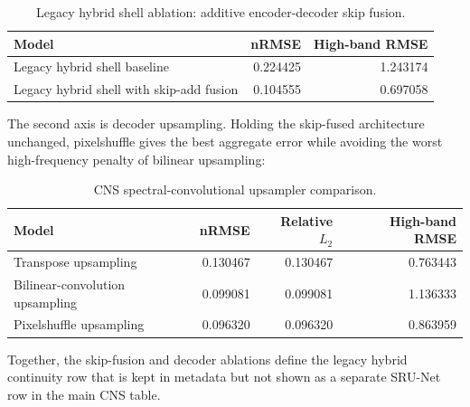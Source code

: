 \documentclass[11pt]{article}
\begin{document}
\begin{table}[h]
\centering
\caption{Legacy hybrid shell ablation: additive encoder-decoder skip fusion.}
\begin{tabular}{lrr}
\toprule
Model & nRMSE & High-band RMSE \\
\midrule
Legacy hybrid shell baseline & 0.224425 & 1.243174 \\
Legacy hybrid shell with skip-add fusion & 0.104555 & 0.697058 \\
\bottomrule
\end{tabular}
\end{table}

The second axis is decoder upsampling. Holding the skip-fused architecture unchanged,
pixelshuffle gives the best aggregate error while avoiding the worst
high-frequency penalty of bilinear upsampling:

\begin{table}[h]
\centering
\caption{CNS spectral-convolutional upsampler comparison.}
\begin{tabular}{lrrr}
\toprule
Model & nRMSE & Relative $L_2$ & High-band RMSE \\
\midrule
Transpose upsampling & 0.130467 & 0.130467 & 0.763443 \\
Bilinear-convolution upsampling & 0.099081 & 0.099081 & 1.136333 \\
Pixelshuffle upsampling & 0.096320 & 0.096320 & 0.863959 \\
\bottomrule
\end{tabular}
\end{table}

Together, the skip-fusion and decoder ablations define the legacy hybrid
continuity row that is kept in metadata but not shown as a separate SRU-Net row
in the main CNS table.
\end{document}
